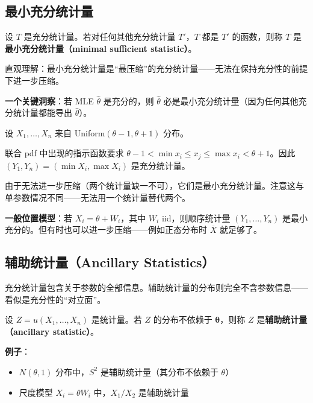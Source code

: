 \subsection{最小充分统计量}

\begin{definition}[最小充分统计量]\label{def:minimal-sufficient}
设 $T$ 是充分统计量。若对任何其他充分统计量 $T'$，$T$ 都是 $T'$ 的函数，则称 $T$ 是\textbf{最小充分统计量（minimal sufficient statistic）}。
\end{definition}

直观理解：最小充分统计量是``最压缩''的充分统计量——无法在保持充分性的前提下进一步压缩。

\textbf{一个关键洞察}：若 MLE $\hat{\theta}$ 是充分的，则 $\hat{\theta}$ 必是最小充分统计量（因为任何其他充分统计量都能导出 $\hat{\theta}$）。

\begin{example}\label{ex:uniform-location-minimal}
设 $X_1, \ldots, X_n$ 来自 Uniform$(\theta-1, \theta+1)$ 分布。

联合 pdf 中出现的指示函数要求 $\theta - 1 < \min x_i \leq x_j \leq \max x_i < \theta + 1$。因此 $(Y_1, Y_n) = (\min X_i, \max X_i)$ 是充分统计量。

由于无法进一步压缩（两个统计量缺一不可），它们是最小充分统计量。注意这与单参数情况不同——无法用一个统计量替代两个。
\end{example}

\textbf{一般位置模型}：若 $X_i = \theta + W_i$，其中 $W_i$ iid，则顺序统计量 $(Y_1, \ldots, Y_n)$ 是最小充分的。但有时也可以进一步压缩——例如正态分布时 $\overline{X}$ 就足够了。

\subsection{辅助统计量（Ancillary Statistics）}

充分统计量包含关于参数的全部信息。辅助统计量的分布则完全不含参数信息——看似是充分性的``对立面''。

\begin{definition}[辅助统计量]\label{def:ancillary}
设 $Z = u(X_1, \ldots, X_n)$ 是统计量。若 $Z$ 的分布不依赖于 $\boldsymbol{\theta}$，则称 $Z$ 是\textbf{辅助统计量（ancillary statistic）}。
\end{definition}

\textbf{例子}：
\begin{itemize}
\item $N(\theta, 1)$ 分布中，$S^2$ 是辅助统计量（其分布不依赖于 $\theta$）
\item 尺度模型 $X_i = \theta W_i$ 中，$X_1/X_2$ 是辅助统计量
\end{itemize}

